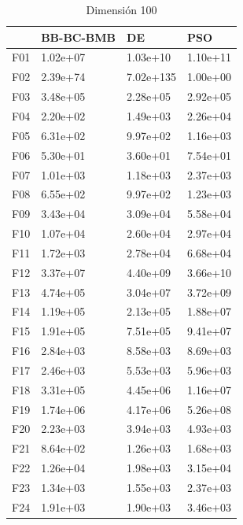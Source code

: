 \begin{table}[H]
\begin{minipage}{.5\linewidth}
    \end{minipage}%
    \begin{minipage}{.5\linewidth}
      \centering
      \caption{Dimensión 100}
      \begin{tabular}{llll}
        \toprule
        {} & BB-BC-BMB &         DE &       PSO \\
        \midrule
        F01  &  1.02e+07 &   1.03e+10 &  1.10e+11 \\
        F02  &  2.39e+74 &  7.02e+135 &  1.00e+00 \\
        F03  &  3.48e+05 &   2.28e+05 &  2.92e+05 \\
        F04  &  2.20e+02 &   1.49e+03 &  2.26e+04 \\
        F05  &  6.31e+02 &   9.97e+02 &  1.16e+03 \\
        F06  &  5.30e+01 &   3.60e+01 &  7.54e+01 \\
        F07  &  1.01e+03 &   1.18e+03 &  2.37e+03 \\
        F08  &  6.55e+02 &   9.97e+02 &  1.23e+03 \\
        F09  &  3.43e+04 &   3.09e+04 &  5.58e+04 \\
        F10  &  1.07e+04 &   2.60e+04 &  2.97e+04 \\
        F11  &  1.72e+03 &   2.78e+04 &  6.68e+04 \\
        F12  &  3.37e+07 &   4.40e+09 &  3.66e+10 \\
        F13  &  4.74e+05 &   3.04e+07 &  3.72e+09 \\
        F14  &  1.19e+05 &   2.13e+05 &  1.88e+07 \\
        F15  &  1.91e+05 &   7.51e+05 &  9.41e+07 \\
        F16  &  2.84e+03 &   8.58e+03 &  8.69e+03 \\
        F17  &  2.46e+03 &   5.53e+03 &  5.96e+03 \\
        F18  &  3.31e+05 &   4.45e+06 &  1.16e+07 \\
        F19  &  1.74e+06 &   4.17e+06 &  5.26e+08 \\
        F20  &  2.23e+03 &   3.94e+03 &  4.93e+03 \\
        F21  &  8.64e+02 &   1.26e+03 &  1.68e+03 \\
        F22  &  1.26e+04 &   1.98e+03 &  3.15e+04 \\
        F23  &  1.34e+03 &   1.55e+03 &  2.37e+03 \\
        F24  &  1.91e+03 &   1.90e+03 &  3.46e+03 \\

\end{tabular}
\end{minipage}
\end{table}
